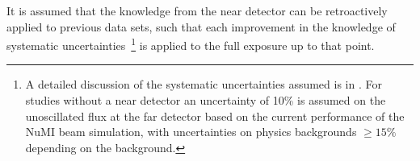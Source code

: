It is assumed that the knowledge from the near detector can be
retroactively applied to previous data sets, such that each
improvement in the knowledge of systematic uncertainties~\footnote{A
  detailed discussion of the systematic uncertainties assumed is in
  \volphys. For studies without a near detector an uncertainty of 10\%
  is assumed on the unoscillated flux at the far detector based on the
  current performance of the NuMI beam simulation, with uncertainties
  on physics backgrounds $\geq 15\%$ depending on the background.} is
applied to the full exposure up to that point.



%


